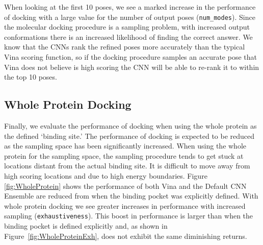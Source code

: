 \documentclass[journal=jcisd8,manuscript=article]{achemso}
\begin{document}
When looking at the first 10 poses, we see a marked increase in the performance of docking with a large value for the number of output poses (\texttt{num\_modes}). Since the molecular docking procedure is a sampling problem, with increased output conformations there is an increased likelihood of finding the correct answer. We know that the CNNs rank the refined poses more accurately than the typical Vina scoring function, so if the docking procedure samples an accurate pose that Vina does not believe is high scoring the CNN will be able to re-rank it to within the top 10 poses.

\subsection{Whole Protein Docking}

Finally, we evaluate the performance of docking when using the whole protein as the defined `binding site.' The performance of docking is expected to be reduced as the sampling space has been significantly increased. When using the whole protein for the sampling space, the sampling procedure tends to get stuck at locations distant from the actual binding site. It is difficult to move away from high scoring locations and due to high energy boundaries. Figure \ref{fig:WholeProtein} shows the performance of both Vina and the Default CNN Ensemble are reduced from when the binding pocket was explicitly defined. With whole protein docking we see greater increases in performance with increased sampling (\texttt{exhaustiveness}). This boost in performance is larger than when the binding pocket is defined explicitly and, as shown in Figure~\ref{fig:WholeProteinExh}, does not exhibit the same diminishing returns.
\end{document}
